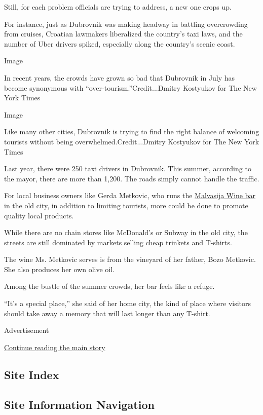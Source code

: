 Still, for each problem officials are trying to address, a new one crops
up.

For instance, just as Dubrovnik was making headway in battling
overcrowding from cruises, Croatian lawmakers liberalized the country's
taxi laws, and the number of Uber drivers spiked, especially along the
country's scenic coast.

Image

In recent years, the crowds have grown so bad that Dubrovnik in July has
become synonymous with ``over-tourism.''Credit...Dmitry Kostyukov for
The New York Times

Image

Like many other cities, Dubrovnik is trying to find the right balance of
welcoming tourists without being overwhelmed.Credit...Dmitry Kostyukov
for The New York Times

Last year, there were 250 taxi drivers in Dubrovnik. This summer,
according to the mayor, there are more than 1,200. The roads simply
cannot handle the traffic.

For local business owners like Gerda Metkovic, who runs the
\href{https://www.facebookcorewwwi.onion/MalvasijaDubrovnik/?timeline_context_item_type=intro_card_work\&timeline_context_item_source=100001080456956}{Malvasija
Wine bar} in the old city, in addition to limiting tourists, more could
be done to promote quality local products.

While there are no chain stores like McDonald's or Subway in the old
city, the streets are still dominated by markets selling cheap trinkets
and T-shirts.

The wine Ms. Metkovic serves is from the vineyard of her father, Bozo
Metkovic. She also produces her own olive oil.

Among the bustle of the summer crowds, her bar feels like a refuge.

``It's a special place,'' she said of her home city, the kind of place
where visitors should take away a memory that will last longer than any
T-shirt.

Advertisement

\protect\hyperlink{after-bottom}{Continue reading the main story}

\hypertarget{site-index}{%
\subsection{Site Index}\label{site-index}}

\hypertarget{site-information-navigation}{%
\subsection{Site Information
Navigation}\label{site-information-navigation}}

